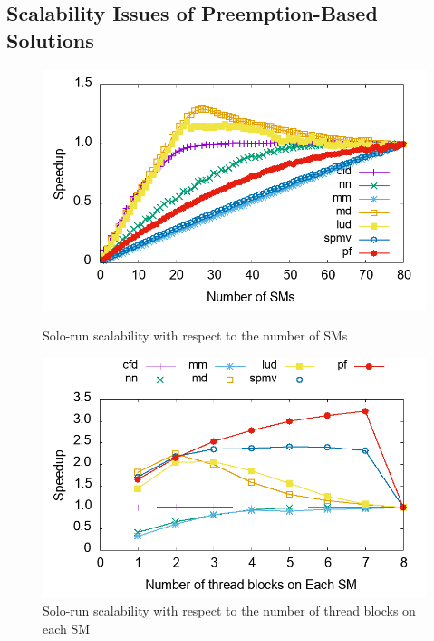 \subsection{Scalability Issues of Preemption-Based Solutions}
\begin{figure}
\vspace{-0.4in}
		\centering
		\begin{minipage}{0.45\linewidth}
		\includegraphics[width=\linewidth]{figures/solo_scalability/sm_scale_new.png}
		\caption{Solo-run scalability with respect to the number of SMs}
		\label{fig:solo-sm}
		\vspace{-0.5cm}
	\end{minipage}
	\hfill
	\begin{minipage}{0.45\linewidth}
		\centering
		\includegraphics[width=\linewidth]{figures/solo_scalability/blk_scale_mul.png}
		\caption{Solo-run scalability with respect to the number of thread blocks on each SM}
		\label{fig:solo-bl}
		\vspace{-0.5cm}
	\end{minipage}
	\end{figure}
